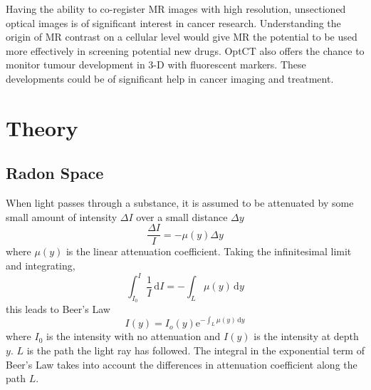 \documentclass[12pt]{article}
\begin{document}
Having the ability to co-register MR images with high resolution, unsectioned optical images  is of significant  interest in cancer research. Understanding the origin of MR contrast on a cellular level would give MR the potential to be used more effectively in screening potential new drugs. OptCT also offers the chance to monitor tumour development in 3-D with fluorescent markers. These developments could be of significant help  in cancer imaging and treatment.





\section{Theory}
\label{sec:theory}




\subsection{Radon Space}

When light passes through a substance, it is assumed to be attenuated by some small amount of intensity $\Delta I$ over a small distance $\Delta y$ 
\begin{equation}
\dfrac{\Delta I}{I} = -\mu(y)\Delta y
\end{equation}
where $\mu(y)$ is the linear attenuation coefficient.
Taking the infinitesimal limit and integrating, 
\begin{equation}
\int_{I_0}^{I} \frac{1}{I}\, \mathrm{d}I = - \int_L \mu(y)\, \mathrm{d}y
\end{equation}
this leads to Beer's Law 
\begin{equation}
I(y) = I_{o}(y)\mathrm{e}^{-\int_L \mu(y)\, \mathrm{d}y}
\label{eq:Beer}
\end{equation}
where $I_0$ is the intensity with no attenuation and $I(y)$ is the intensity at depth $y$. $L$ is the path the light ray has followed. The integral in the exponential term of Beer's Law takes into account the differences in attenuation coefficient along the path $L$. 
\end{document}
